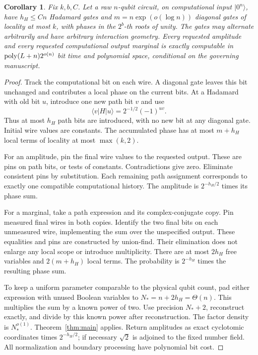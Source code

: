 \documentclass[11pt,a4paper]{article}
\newtheorem{corollary}[theorem]{Corollary}
\theoremstyle{remark}\newtheorem{remark}[theorem]{Remark}
\begin{document}
\begin{corollary}\label{cor:hadamard}
Fix $k,b,C$. Let a raw $n$-qubit circuit, on computational input $|0^n\rangle$,
have $h_H\le Cn$ Hadamard gates and $m=n\exp(o(\log n))$ diagonal gates
of locality at most $k$, with phases in the $2^b$-th roots of unity.
The gates may alternate arbitrarily and have arbitrary interaction
geometry. Every requested amplitude and every requested computational
output marginal is exactly computable in $\operatorname{poly}(L+n)2^{o(n)}$ bit time
and polynomial space, conditional on the governing manuscript.
\end{corollary}
\begin{proof}
Track the computational bit on each wire. A diagonal gate leaves this
bit unchanged and contributes a local phase on the current bits. At a
Hadamard with old bit $u$, introduce one new path bit $v$ and use
\[
 \langle v|H|u\rangle=2^{-1/2}(-1)^{uv}.
\]
Thus at most $h_H$ path bits are introduced, with no new bit at any
diagonal gate. Initial wire values are constants. The accumulated phase
has at most $m+h_H$ local terms of locality at most $\max(k,2)$.

For an amplitude, pin the final wire values to the requested output.
These are pins on path bits, or tests of constants. Contradictions give
zero. Eliminate consistent pins by substitution. Each remaining path
assignment corresponds to exactly one compatible computational history.
The amplitude is $2^{-h_H/2}$ times its phase sum.

For a marginal, take a path expression and its complex-conjugate copy.
Pin measured final wires in both copies. Identify the two final bits
on each unmeasured wire, implementing the sum over the unspecified output.
These equalities and pins are constructed by union-find. Their elimination
does not enlarge any local scope or introduce multiplicity. There are at
most $2h_H$ free variables and $2(m+h_H)$ local terms. The probability
is $2^{-h_H}$ times the resulting phase sum.

To keep a uniform parameter comparable to the physical qubit count,
pad either expression with unused Boolean variables to
$N_*=n+2h_H=\Theta(n)$. This multiplies the sum by a known power of two.
Use precision $N_*+2$, reconstruct exactly, and divide by this known
power after reconstruction. The factor density is $N_*^{o(1)}$.
Theorem~\ref{thm:main} applies. Return amplitudes as exact cyclotomic
coordinates times $2^{-h_H/2}$; if necessary $\sqrt2$ is adjoined to
the fixed number field. All normalization and boundary processing
have polynomial bit cost.
\end{proof}
\end{document}
